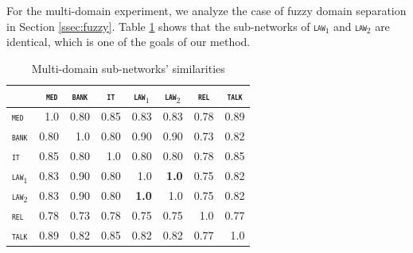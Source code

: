 \documentclass[11pt]{article}
\newcommand{\domain}[1]{\texttt{\textsc{#1}}}
\newcommand{\SB}[1]{\textbf{#1}}
\begin{document}
For the multi-domain experiment, we analyze the case of fuzzy domain separation in Section \ref{ssec:fuzzy}. Table \ref{tab:fuzzy-sim} shows that the sub-networks of \domain{law$_1$} and \domain{law$_2$} are identical, which is one of the goals of our method.
\begin{table}[h!]
  \centering
  \begin{tabular}{|p{1cm}|*{7}{r|}} \hline
    & \multicolumn{1}{c|}{\domain{ med}} & \multicolumn{1}{c|}{\domain{bank}}& \multicolumn{1}{c|}{\domain{ it }} & \multicolumn{1}{c|}{\domain{law$_1$}} & \multicolumn{1}{c|}{\domain{law$_2$}} & \multicolumn{1}{c|}{\domain{rel}} &\multicolumn{1}{c|}{\domain{talk}} \\ \hline 
    \domain{med} &1.0&0.80&0.85&0.83&0.83&0.78&0.89\\
    \domain{bank} &0.80&1.0&0.80&0.90&0.90&0.73&0.82\\
    \domain{it} &0.85&0.80&1.0&0.80&0.80&0.78&0.85\\
    \domain{law$_1$} &0.83&0.90&0.80&1.0&\SB{1.0}&0.75&0.82\\ 
    \domain{law$_2$} &0.83&0.90&0.80&\SB{1.0}&1.0&0.75&0.82\\ 
    \domain{rel} &0.78&0.73&0.78&0.75&0.75&1.0&0.77\\
    \domain{talk} &0.89&0.82&0.85&0.82&0.82&0.77&1.0\\
    \hline
  \end{tabular}
  \caption{Multi-domain sub-networks' similarities}
  \label{tab:fuzzy-sim}
\end{table}      
\end{document}
